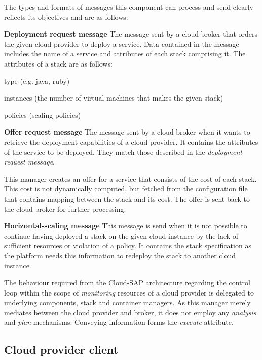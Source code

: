 The types and formats of messages this component can process and send clearly reflects its objectives and are as follows:
\begin{asparaenum}
\item[\textbf{Deployment request message}] The message sent by a cloud broker that orders the given cloud provider to deploy a service. Data contained in the message includes the name of a service and attributes of each stack comprising it. The attributes of a stack are as follows:
  \begin{compactitem}
  \item type (e.g. java, ruby)
  \item instances (the number of virtual machines that makes the given stack)
  \item policies (scaling policies)
  \end{compactitem}
\item[\textbf{Offer request message}] The message sent by a cloud broker when it wants to retrieve the deployment capabilities of a cloud provider. It contains the attributes of the service to be deployed. They match those described in the \emph{deployment request message}.

  This manager creates an offer for a service that consists of the cost of each stack. This cost is not dynamically computed, but fetched from the configuration file that contains mapping between the stack and its cost. The offer is sent back to the cloud broker for further processing.
\item[\textbf{Horizontal-scaling message}] This message is send when it is not possible to continue having deployed a stack on the given cloud instance by the lack of sufficient resources or violation of a policy. It contains the stack specification as the platform needs this information to redeploy the stack to another cloud instance.
\end{asparaenum}

The behaviour required from the Cloud-SAP architecture regarding the control loop within the scope of \emph{monitoring} resources of a cloud provider is delegated to underlying components, stack and container managers. As this manager merely mediates between the cloud provider and broker, it does not employ any \emph{analysis} and \emph{plan} mechanisms. Conveying information forms the \emph{execute} attribute.

\subsection{Cloud provider client}
